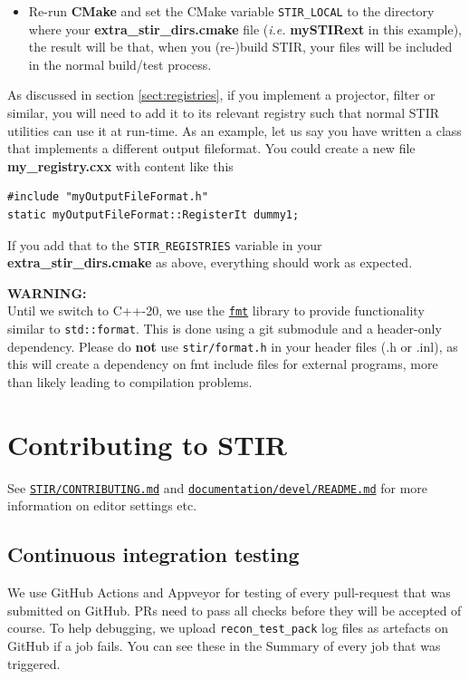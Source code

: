 \documentclass{article}
\def\R2Lurl#1#2{\mbox{\href{#1}{\tt #2}}}
\begin{document}
\begin{itemize}
\item Re-run \textbf{CMake} and set the CMake variable \texttt{STIR\_LOCAL} to the directory where your
\textbf{extra\_stir\_dirs.cmake} file (\textit{i.e.} \textbf{mySTIRext} in this example),
the result will be that, when you (re-)build STIR, your files will be included in 
the normal build/test process.
\end{itemize}

As discussed in section \ref{sect:registries}, if you implement a projector, filter
or similar, you will need to add it to its relevant registry
such that normal STIR utilities can use it at run-time.
As an example, let us say you have written a class that implements
a different output fileformat. You could create a new file \textbf{my\_registry.cxx} with
content like this
\begin{verbatim}
#include "myOutputFileFormat.h"
static myOutputFileFormat::RegisterIt dummy1;
\end{verbatim}
If you add that to the \texttt{STIR\_REGISTRIES} variable in your \textbf{extra\_stir\_dirs.cmake}
as above, everything should work as expected.

\textbf{WARNING:}\\
Until we switch to C++-20, we use the \R2Lurl{https://github.com/fmtlib/fmt}{fmt} library to
provide functionality similar to \texttt{std::format}. This is done using a git submodule
and a header-only dependency.
Please do \textbf{not} use \texttt{stir/format.h} in your header files (.h or .inl), as this
will create a dependency on fmt include files for external programs, more than likely leading to
compilation problems.

\section{Contributing to STIR}
See
\R2Lurl{https://github.com/UCL/STIR/blob/master/CONTRIBUTING.md}{STIR/CONTRIBUTING.md}
and
\R2Lurl{https://github.com/UCL/STIR/blob/master/documentation/devel/README.md}{documentation/devel/README.md}
for more information on editor settings etc.

\subsection{Continuous integration testing}
We use GitHub Actions and Appveyor for testing of every pull-request that was submitted on GitHub. PRs
need to pass all checks before they will be accepted of course.
To help debugging, we upload \texttt{recon\_test\_pack} log files as artefacts on
GitHub if a job fails. You can see these in the Summary of every job that was triggered.
\end{document}
